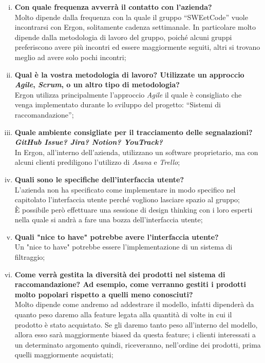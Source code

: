 \documentclass{article}
\begin{document}
\begin{paracol}{2}
\begin{enumerate}[i.]
    \item \textbf{Con quale frequenza avverrà il contatto con l’azienda?}\\
    Molto dipende dalla frequenza con la quale il gruppo “SWEetCode” vuole incontrarsi con Ergon, solitamente cadenza settimanale. In particolare molto dipende dalla metodologia di lavoro del gruppo, poiché alcuni gruppi preferiscono avere più incontri ed essere maggiormente seguiti, altri si trovano meglio ad avere solo pochi incontri;
    \item \textbf{Qual è la vostra metodologia di lavoro? Utilizzate un approccio \textit{Agile}, \textit{Scrum}, o un altro tipo di metodologia?}\\
    Ergon utilizza principalmente l'approccio \textit{Agile} il quale è consigliato che venga implementato durante lo sviluppo del progetto: “Sistemi di raccomandazione”;
    \item \textbf{Quale ambiente consigliate per il tracciamento delle segnalazioni? \textit{GitHub Issue? Jira? Notion? YouTrack?}}\\
    In Ergon, all'interno dell'azienda, utilizzano un software proprietario, ma con alcuni clienti prediligono l’utilizzo di \textit{Asana} e \textit{Trello};
    \item \textbf{Quali sono le specifiche dell’interfaccia utente?} \\
    L’azienda non ha specificato come implementare in modo specifico nel capitolato l’interfaccia utente perché vogliono lasciare spazio al gruppo;\\
    È possibile però effettuare una sessione di design thinking con i loro esperti nella quale si andrà a fare una bozza dell'interfaccia utente;
    \item \textbf{Quali "nice to have" potrebbe avere l’interfaccia utente?}\\
    Un "nice to have" potrebbe essere l'implementazione di un sistema di filtraggio;
    \item \textbf{Come verrà gestita la diversità dei prodotti nel sistema di raccomandazione? Ad esempio, come verranno gestiti i prodotti molto popolari rispetto a quelli meno conosciuti?}\\
    Molto dipende come andremo ad addestrare il modello, infatti dipenderà da quanto peso daremo alla feature legata alla quantità di volte in cui il prodotto è stato acquistato. Se gli daremo tanto peso all’interno del modello, allora esso sarà maggiormente biased da questa feature;  i clienti interessati a un determinato argomento quindi, riceveranno, nell’ordine dei prodotti, prima quelli maggiormente acquistati;

\end{enumerate}
\end{paracol}
\end{document}
